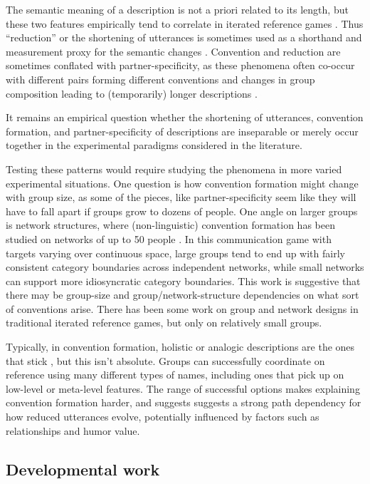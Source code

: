 \documentclass[]{article}
\begin{document}
The semantic meaning of a description is not a priori related to its length, but these two features empirically tend to correlate in iterated reference games \citep{hawkins2020b}.  Thus ``reduction'' or the shortening of utterances is sometimes used as a shorthand and measurement proxy for the semantic changes \citep{clark1986, hawkins2021}. Convention and reduction are sometimes conflated with partner-specificity, as these phenomena often co-occur with different pairs forming different conventions and changes in group composition leading to (temporarily) longer descriptions \citep{clark1986, wilkes-gibbs1992}. 

It remains an empirical question whether the shortening of utterances, convention formation, and partner-specificity of descriptions are inseparable or merely occur together in the experimental paradigms considered in the literature. 

Testing these patterns would require studying the phenomena in more varied experimental situations. One question is how convention formation might change with group size, as some of the pieces, like partner-specificity seem like they will have to fall apart if groups grow to dozens of people. One angle on larger groups is network structures, where (non-linguistic) convention formation has been studied on networks of up to 50 people \citep{guilbeault2021}. In this communication game with targets varying over continuous space, large groups tend to end up with fairly consistent category boundaries across independent networks, while small networks can support more idiosyncratic category boundaries. This work is suggestive that there may be group-size and group/network-structure dependencies on what sort of conventions arise. There has been some work on group and network designs in traditional iterated reference games, but only on relatively small groups. 

Typically, in convention formation, holistic or analogic descriptions are the ones that stick \citep{clark1986}, but this isn't absolute. Groups can successfully coordinate on reference using many different types of names, including ones that pick up on low-level or meta-level features. The range of successful options makes explaining convention formation harder, and suggests  suggests a strong path dependency for how reduced utterances evolve, potentially influenced by factors such as relationships and humor value. 

\subsection{Developmental work}
\end{document}
